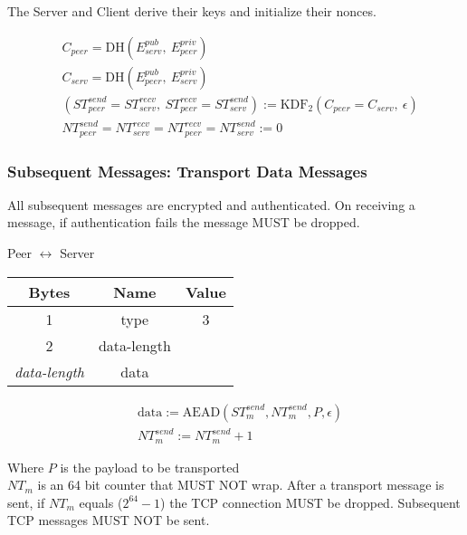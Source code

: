 The Server and Client derive their keys and initialize their nonces.

\begin{align*}
    & C_{peer} = \text{DH}(E_{serv}^{pub},\ E_{peer}^{priv})\\
    & C_{serv} = \text{DH}(E_{peer}^{pub},\ E_{serv}^{priv})\\
    & (\mathit{ST}_{peer}^{send} = \mathit{ST}_{serv}^{recv},\ \mathit{ST}_{peer}^{recv} = \mathit{ST}_{serv}^{send}) := \text{KDF}_2(C_{peer} = C_{serv},
    \ \epsilon) \\
    & \mathit{NT}_{peer}^{send} = \mathit{NT}_{serv}^{recv} = \mathit{NT}_{peer}^{recv} = \mathit{NT}_{serv}^{send} := 0
\end{align*}

\subsubsection{Subsequent Messages: Transport Data Messages}

All subsequent messages are encrypted and authenticated. On receiving a message, if authentication fails the message
MUST be dropped.

\begin{center}
    Peer $\leftrightarrow$ Server\\
    \begin{tabular}{|c|c|c|}
        \hline
        \textbf{Bytes}     & \textbf{Name} & \textbf{Value} \\
        \hline
        1                  & type          & 3              \\
        \hline
        2                  & data-length   &                \\
        \hline
        \emph{data-length} & data          &                \\
        \hline
    \end{tabular}
\end{center}

\begin{align*}
    & \text{data} := \text{AEAD}(\mathit{ST}_{m}^{send}, \mathit{NT}_{m}^{send}, P, \epsilon) \\
    & \mathit{NT}_{m}^{send} := \mathit{NT}_{m}^{send} + 1
\end{align*}

Where $P$ is the payload to be transported\\

$\mathit{NT}_{m}$ is an 64 bit counter that MUST NOT wrap. After a transport message is sent, if $\mathit{NT}_{m}$ equals
($2^{64}-1$) the TCP connection MUST be dropped. Subsequent TCP messages MUST NOT be sent. \\

